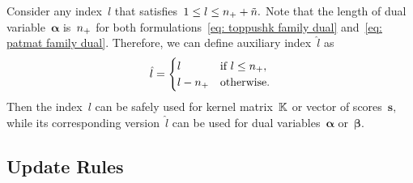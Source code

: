 \begin{notation}\label{not: dual update rules}
  Consider any index~$l$ that satisfies~$1 \leq l \leq n_{+} + \tilde{n}.$ Note that the length of dual variable~$\bm{\alpha}$ is~$n_{+}$ for both formulations~\eqref{eq: toppushk family dual} and~\eqref{eq: patmat family dual}. Therefore, we can define auxiliary index~$\hat{l}$ as 
  \begin{equation*}
    \hat{l} = \begin{cases}
      l & \text{if } l \leq n_{+}, \\
      l - n_{+} & \text{otherwise}.
    \end{cases}
  \end{equation*}
  Then the index~$l$ can be safely used for kernel matrix~$\mathbb{K}$ or vector of scores~$\bm{s},$ while its corresponding version~$\hat{l}$ can be used for dual variables~$\bm{\alpha}$ or~$\bm{\beta}.$
\end{notation}

\subsection{Update Rules}\label{sec: Top coordinate descent}

